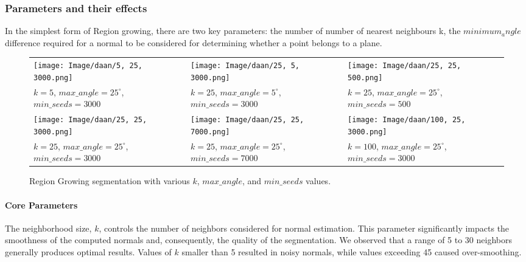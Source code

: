\documentclass[a4paper,9pt]{article}
\begin{document}
\subsubsection{Parameters and their effects}
In the simplest form of Region growing, there are two key parameters: the number of number of nearest neighbours k, the $minimum_angle$ difference required for a normal to be considered for determining whether a point belongs to a plane.

\begin{figure}[H]
    \begin{tabularx}{\textwidth}{XXX}
        \texttt{[image: Image/daan/5, 25, 3000.png]} & 
        \texttt{[image: Image/daan/25, 5, 3000.png]} & 
        \texttt{[image: Image/daan/25, 25, 500.png]} \\
        $k = 5$, $max\_angle = 25^\circ$, $min\_seeds = 3000$ & 
        $k = 25$, $max\_angle = 5^\circ$, $min\_seeds = 3000$ & 
        $k = 25$, $max\_angle = 25^\circ$, $min\_seeds = 500$ \\
        \texttt{[image: Image/daan/25, 25, 3000.png]} & 
        \texttt{[image: Image/daan/25, 25, 7000.png]} & 
        \texttt{[image: Image/daan/100, 25, 3000.png]} \\
        $k = 25$, $max\_angle = 25^\circ$, $min\_seeds = 3000$ & 
        $k = 25$, $max\_angle = 25^\circ$, $min\_seeds = 7000$ & 
        $k = 100$, $max\_angle = 25^\circ$, $min\_seeds = 3000$
    \end{tabularx}
    \caption{Region Growing segmentation with various $k$, $max\_angle$, and $min\_seeds$ values.}
    \label{fig:region_growing_variants}
\end{figure}

\paragraph{Core Parameters}
The neighborhood size, \( k \), controls the number of neighbors considered for normal estimation. This parameter significantly impacts the smoothness of the computed normals and, consequently, the quality of the segmentation. We observed that a range of 5 to 30 neighbors generally produces optimal results. Values of \( k \) smaller than 5 resulted in noisy normals, while values exceeding 45 caused over-smoothing.
\end{document}
